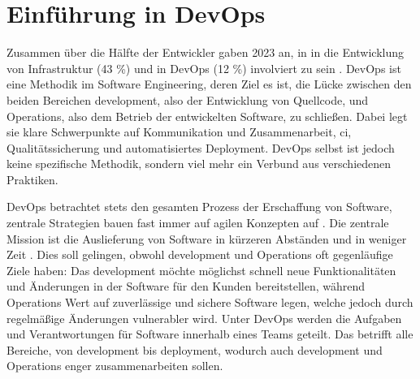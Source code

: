\section{Einführung in DevOps}
\label{sec:03-01_introduction-to-devops}

Zusammen über die Hälfte der Entwickler gaben 2023 an, in in die Entwicklung von Infrastruktur (43 \%) und in DevOps (12 \%) involviert zu sein \cite{207:Developer-Ecosystem}. DevOps ist eine Methodik im Software Engineering, deren Ziel es ist, die Lücke zwischen den beiden Bereichen \Gls{development}, also der Entwicklung von Quellcode, und Operations, also dem Betrieb der entwickelten Software, zu schließen. Dabei legt sie klare Schwerpunkte auf Kommunikation und Zusammenarbeit, \acrlong{ci}, Qualitätssicherung und automatisiertes Deployment. DevOps selbst ist jedoch keine spezifische Methodik, sondern viel mehr ein Verbund aus verschiedenen Praktiken. \cite{001:DevOps-Adoption-in-Software-Development}

DevOps betrachtet stets den gesamten Prozess der Erschaffung von Software, zentrale Strategien bauen fast immer auf agilen Konzepten auf \cite{001:DevOps-Adoption-in-Software-Development}. Die zentrale Mission ist die Auslieferung von Software in kürzeren Abständen und in weniger Zeit \cite{006:Prevalence-of-GitOps-DevOps-in-Fast-CI-CD-Cycles}. Dies soll gelingen, obwohl \Gls{development} und Operations oft gegenläufige Ziele haben: Das \Gls{development} möchte möglichst schnell neue Funktionalitäten und Änderungen in der Software für den Kunden bereitstellen, während Operations Wert auf zuverlässige und sichere Software legen, welche jedoch durch regelmäßige Änderungen vulnerabler wird. Unter DevOps werden die Aufgaben und Verantwortungen für Software innerhalb eines Teams geteilt. Das betrifft alle Bereiche, von \Gls{development} bis \Gls{deployment}, wodurch auch \Gls{development} und Operations enger zusammenarbeiten sollen. \cite{000:CI-CD-Deployment-in-DevOps-reduce-Gap-Developer-Operation}


